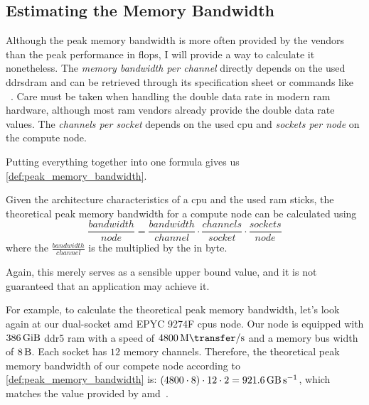 \subsection{Estimating the Memory Bandwidth}
\label{sec:perf:mem_bandwidth}

Although the peak memory bandwidth is more often provided by the vendors than the peak performance in \gls{flops}, I will provide a way to calculate it nonetheless. 
The \textit{memory bandwidth per channel} directly depends on the used \gls{ddrsdram} and can be retrieved through its specification sheet or commands like ~\cite{cox_dmidecode8_nodate}. 
Care must be taken when handling the double data rate in modern \gls{ram} hardware, although most \gls{ram} vendors already provide the double data rate values. 
The \textit{channels per socket} depends on the used \gls{cpu} and \textit{sockets per node} on the compute node. 

Putting everything together into one formula gives us \autoref{def:peak_memory_bandwidth}. 

\begin{definition}\label{def:peak_memory_bandwidth}
Given the architecture characteristics of a \gls{cpu} and the used \gls{ram} sticks, the theoretical peak memory bandwidth for a compute node can be calculated using
$$ \frac{bandwidth}{node} = \frac{bandwidth}{channel} \cdot \frac{channels}{socket} \cdot \frac{sockets}{node} $$
where the $\frac{bandwidth}{channel}$ is the  multiplied by the  in byte.
\end{definition}
Again, this merely serves as a sensible upper bound value, and it is not guaranteed that an application may achieve it. 

For example, to calculate the theoretical peak memory bandwidth, let's look again at our dual-socket \gls{amd} EPYC 9274F \glspl{cpu} node. 
Our node is equipped with $\SI{386}{\gibi\byte}$ \acrshort{ddr}5 \acrshort{ram} with a speed of $\SI{4800}{\mega\transfer\per\second}$ and a memory bus width of $\SI{8}{\byte}$. 
Each socket has $\num{12}$ memory channels. 
Therefore, the theoretical peak memory bandwidth of our compete node according to \autoref{def:peak_memory_bandwidth} is: $(\num{4800} \cdot 8) \cdot 12 \cdot 2 = \SI{921.6}{\giga\byte\per\second}$, which matches the value provided by \gls{amd}~\cite{amd_amd_2022}.

